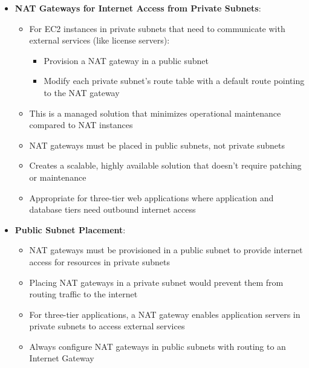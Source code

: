 \documentclass[11pt,a4paper]{report}
\begin{document}
\begin{itemize}
\begin{itemize}
  \item Eliminates data processing and transfer costs associated with routing S3 traffic through NAT gateways
  \item More cost-effective than using NAT instances or multiple NAT gateways for S3 access
  \item Provides direct, private connectivity to S3 without traversing the public internet or NAT devices
\end{itemize}
  \item \textbf{NAT Gateways for Internet Access from Private Subnets}:
\begin{itemize}
  \item For EC2 instances in private subnets that need to communicate with external services (like license servers):
\begin{itemize}
  \item Provision a NAT gateway in a public subnet
  \item Modify each private subnet's route table with a default route pointing to the NAT gateway
\end{itemize}
  \item This is a managed solution that minimizes operational maintenance compared to NAT instances
  \item NAT gateways must be placed in public subnets, not private subnets
  \item Creates a scalable, highly available solution that doesn't require patching or maintenance
  \item Appropriate for three-tier web applications where application and database tiers need outbound internet access
\end{itemize}
  \item \textbf{Public Subnet Placement}:
\begin{itemize}
  \item NAT gateways must be provisioned in a public subnet to provide internet access for resources in private subnets
  \item Placing NAT gateways in a private subnet would prevent them from routing traffic to the internet
  \item For three-tier applications, a NAT gateway enables application servers in private subnets to access external services
  \item Always configure NAT gateways in public subnets with routing to an Internet Gateway
\end{itemize}
\end{itemize}
\end{document}
